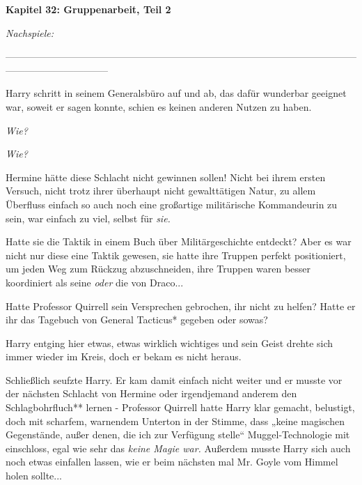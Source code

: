 

\hypertarget{gruppenarbeit-teil-2}{%

\textbf{Kapitel 32: Gruppenarbeit, Teil 2\\ }

\hfill\break \emph{Nachspiele:}

--------------------------------------------------------------------------------------------------------------------------------------------

\hfill\break Harry schritt in seinem Generalsbüro auf und ab, das dafür wunderbar geeignet war, soweit er sagen konnte, schien es keinen anderen Nutzen zu haben.

\emph{Wie?}

\emph{Wie?}

Hermine hätte diese Schlacht nicht gewinnen sollen! Nicht bei ihrem ersten Versuch, nicht trotz ihrer überhaupt nicht gewalttätigen Natur, zu allem Überfluss einfach so auch noch eine großartige militärische Kommandeurin zu sein, war einfach zu viel, selbst für \emph{sie.}

Hatte sie die Taktik in einem Buch über Militärgeschichte entdeckt? Aber es war nicht nur diese eine Taktik gewesen, sie hatte ihre Truppen perfekt positioniert, um jeden Weg zum Rückzug abzuschneiden, ihre Truppen waren besser koordiniert als seine \emph{oder} die von Draco...

Hatte Professor Quirrell sein Versprechen gebrochen, ihr nicht zu helfen? Hatte er ihr das Tagebuch von General Tacticus* gegeben oder sowas?

Harry entging hier etwas, etwas wirklich wichtiges und sein Geist drehte sich immer wieder im Kreis, doch er bekam es nicht heraus.

Schließlich seufzte Harry. Er kam damit einfach nicht weiter und er musste vor der nächsten Schlacht von Hermine oder irgendjemand anderem den Schlagbohrfluch** lernen - Professor Quirrell hatte Harry klar gemacht, belustigt, doch mit scharfem, warnendem Unterton in der Stimme, dass „keine magischen Gegenstände, außer denen, die ich zur Verfügung stelle“ Muggel-Technologie mit einschloss, egal wie sehr das \emph{keine Magie war.} Außerdem musste Harry sich auch noch etwas einfallen lassen, wie er beim nächsten mal Mr. Goyle vom Himmel holen sollte...

}
